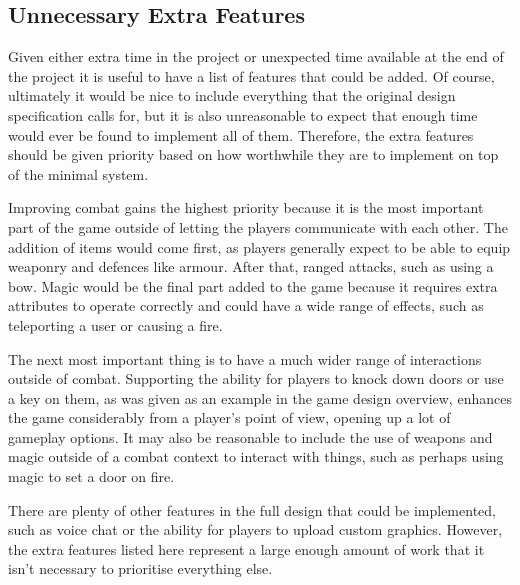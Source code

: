 \subsection{Unnecessary Extra Features}
Given either extra time in the project or unexpected time available at the end of the project it is useful to have a list of features that could be added. Of course, ultimately it would be nice to include everything that the original design specification calls for, but it is also unreasonable to expect that enough time would ever be found to implement all of them. Therefore, the extra features should be given priority based on how worthwhile they are to implement on top of the minimal system.

Improving combat gains the highest priority because it is the most important part of the game outside of letting the players communicate with each other. The addition of items would come first, as players generally expect to be able to equip weaponry and defences like armour. After that, ranged attacks, such as using a bow. Magic would be the final part added to the game because it requires extra attributes to operate correctly and could have a wide range of effects, such as teleporting a user or causing a fire.

The next most important thing is to have a much wider range of interactions outside of combat. Supporting the ability for players to knock down doors or use a key on them, as was given as an example in the game design overview, enhances the game considerably from a player's point of view, opening up a lot of gameplay options. It may also be reasonable to include the use of weapons and magic outside of a combat context to interact with things, such as perhaps using magic to set a door on fire.

There are plenty of other features in the full design that could be implemented, such as voice chat or the ability for players to upload custom graphics. However, the extra features listed here represent a large enough amount of work that it isn't necessary to prioritise everything else.



